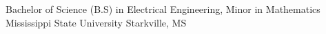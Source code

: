 

\begin{cventries}
  \cventry
    {Bachelor of Science (B.S) in Electrical Engineering, Minor in Mathematics} %
    {Mississippi State University} %
    {Starkville, MS} %
    {}{}{}

\end{cventries}
